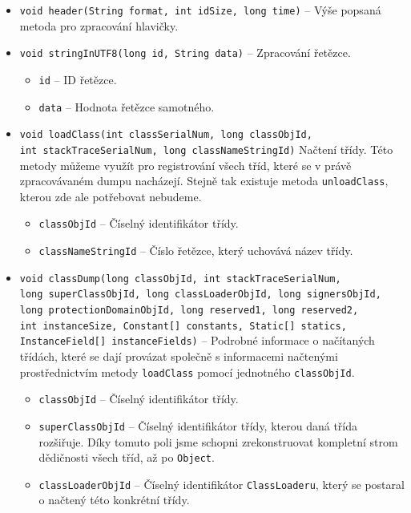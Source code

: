 \begin{itemize}
    \item \texttt{void header(String format, int idSize, long time)} -- Výše popsaná metoda pro zpracování hlavičky.
    \item \texttt{void stringInUTF8(long id, String data)} -- Zpracování řetězce.
        \begin{itemize}
            \item \texttt{id} -- ID řetězce.
            \item \texttt{data} -- Hodnota řetězce samotného.
        \end{itemize}
    \item \texttt{void loadClass(int classSerialNum, long classObjId,\\ int stackTraceSerialNum, long classNameStringId)} Načtení třídy. Této metody můžeme využít pro registrování všech tříd, které se v právě zpracovávaném dumpu nacházejí. Stejně tak existuje metoda \texttt{unloadClass}, kterou zde ale potřebovat nebudeme.
        \begin{itemize}
            \item \texttt{classObjId} -- Číselný identifikátor třídy.
            \item \texttt{classNameStringId} -- Číslo řetězce, který uchovává název třídy.
        \end{itemize}
    \item \texttt{void classDump(long classObjId,
    int stackTraceSerialNum, \\
    long superClassObjId,
    long classLoaderObjId,
    long signersObjId, \\
    long protectionDomainObjId,
    long reserved1,
    long reserved2,\\
    int instanceSize,
    Constant[] constants,
    Static[] statics,\\
    InstanceField[] instanceFields)} -- Podrobné informace o načítaných třídách, které se dají provázat společně s informacemi načtenými prostřednictvím metody \texttt{loadClass} pomocí jednotného \texttt{classObjId}.
        \begin{itemize}
            \item \texttt{classObjId} -- Číselný identifikátor třídy.
            \item \texttt{superClassObjId} -- Číselný identifikátor třídy, kterou daná třída rozšiřuje. Díky tomuto poli jsme schopni zrekonstruovat kompletní strom dědičnosti všech tříd, až po \texttt{Object}.
            \item \texttt{classLoaderObjId} -- Číselný identifikátor \texttt{Class\-Loaderu}, který se postaral o načtený této konkrétní třídy.

\end{itemize}
\end{itemize}
